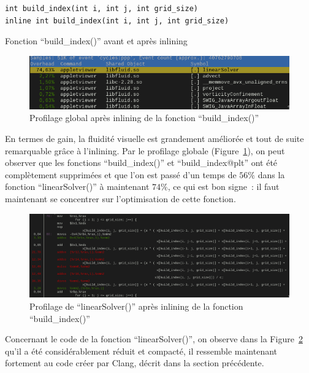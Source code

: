 \documentclass[12pt,a4paper]{article}
\begin{document}
\begin{listing}[h]
    \begin{verbatim}
int build_index(int i, int j, int grid_size)
inline int build_index(int i, int j, int grid_size)
    \end{verbatim}
    \caption{Fonction \enquote{build\_index()} avant et après inlining}
    \label{lst.optim.inlin}
\end{listing}

\begin{figure}
    \centering
    \includegraphics[scale=0.55]{figures/optims/inlining/global.png}
    \caption{Profilage global après inlining de la fonction \enquote{build\_index()}}
    \label{fig.optim.inlin.global}
\end{figure}

En termes de gain, la fluidité visuelle est grandement améliorée et tout de
suite remarquable grâce à l'inlining. Par le profilage globale
(Figure~\ref{fig.optim.inlin.global}), on peut observer que les fonctions
\enquote{build\_index()} et \enquote{build\_index@plt} ont été complètement
supprimées et que l'on est passé d'un temps de $56\%$ dans la fonction
\enquote{linearSolver()} à maintenant $74\%$, ce qui est bon signe : il faut
maintenant se concentrer sur l'optimisation de cette fonction.

\begin{figure}
    \centering
    \includegraphics[scale=0.37]{figures/optims/inlining/linearSolver.png}
    \caption{Profilage de \enquote{linearSolver()} après inlining de la fonction \enquote{build\_index()}}
    \label{fig.optim.inlin.linearSolver}
\end{figure}

Concernant le code de la fonction \enquote{linearSolver()}, on observe dans la
Figure~\ref{fig.optim.inlin.linearSolver} qu'il a été considérablement réduit et
compacté, il ressemble maintenant fortement au code créer par Clang, décrit
dans la section précédente.
\end{document}
